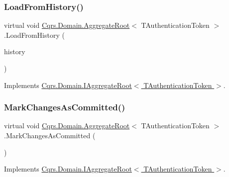 \subsubsection{\texorpdfstring{Load\+From\+History()}{LoadFromHistory()}}
{\footnotesize\ttfamily virtual void \hyperlink{classCqrs_1_1Domain_1_1AggregateRoot}{Cqrs.\+Domain.\+Aggregate\+Root}$<$ T\+Authentication\+Token $>$.Load\+From\+History (\begin{DoxyParamCaption}\item[{I\+Enumerable$<$ \hyperlink{interfaceCqrs_1_1Events_1_1IEvent}{I\+Event}$<$ T\+Authentication\+Token $>$$>$}]{history }\end{DoxyParamCaption})\hspace{0.3cm}{\ttfamily [virtual]}}



Implements \hyperlink{interfaceCqrs_1_1Domain_1_1IAggregateRoot_afe9329ee26ae68613059189ca64dfe60_afe9329ee26ae68613059189ca64dfe60}{Cqrs.\+Domain.\+I\+Aggregate\+Root$<$ T\+Authentication\+Token $>$}.

\mbox{\label{classCqrs_1_1Domain_1_1AggregateRoot_adab968b830e186cb832583910bf6f3a6_adab968b830e186cb832583910bf6f3a6}} 
\subsubsection{\texorpdfstring{Mark\+Changes\+As\+Committed()}{MarkChangesAsCommitted()}}
{\footnotesize\ttfamily virtual void \hyperlink{classCqrs_1_1Domain_1_1AggregateRoot}{Cqrs.\+Domain.\+Aggregate\+Root}$<$ T\+Authentication\+Token $>$.Mark\+Changes\+As\+Committed (\begin{DoxyParamCaption}{ }\end{DoxyParamCaption})\hspace{0.3cm}{\ttfamily [virtual]}}



Implements \hyperlink{interfaceCqrs_1_1Domain_1_1IAggregateRoot_af31116870bbf6566b3eec0b8bc02c6de_af31116870bbf6566b3eec0b8bc02c6de}{Cqrs.\+Domain.\+I\+Aggregate\+Root$<$ T\+Authentication\+Token $>$}.



